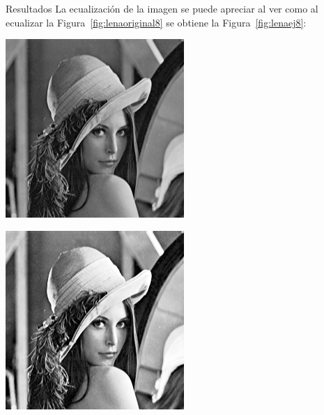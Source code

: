 \documentclass{beamer}
\begin{document}
\begin{frame}[fragile]{Resultados}
	\justifying
	La ecualización de la imagen se puede apreciar al ver como al ecualizar la Figura~\ref{fig:lenaoriginal8} se obtiene la Figura~\ref{fig:lenaej8}:
	\vspace{0.5cm}
	
	\centering
	\begin{minipage}{0.45\linewidth}
		\centering
		\includegraphics[width=\linewidth]{../results/lena_original}
		\label{fig:lenaoriginal8}
	\end{minipage}\hfill
	\begin{minipage}{0.45\linewidth}
		\centering
		\includegraphics[width=\linewidth]{../results/lena_ej5}

\end{minipage}
\end{frame}
\end{document}
